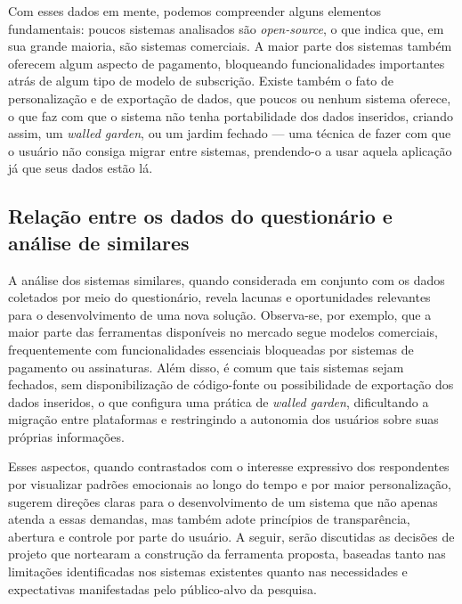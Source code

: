 Com esses dados em mente, podemos compreender alguns elementos fundamentais:
poucos sistemas analisados são \textit{open-source}, o que indica que, em sua
grande maioria, são sistemas comerciais. A maior parte dos sistemas também
oferecem algum aspecto de pagamento, bloqueando funcionalidades importantes
atrás de algum tipo de modelo de subscrição. Existe também o fato de
personalização e de exportação de dados, que poucos ou nenhum sistema oferece,
o que faz com que o sistema não tenha portabilidade dos dados inseridos,
criando assim, um \textit{walled garden}, ou um jardim fechado --- uma técnica de
fazer com que o usuário não consiga migrar entre sistemas, prendendo-o a usar
aquela aplicação já que seus dados estão lá.

\subsection{Relação entre os dados do questionário e análise de similares}

A análise dos sistemas similares, quando considerada em conjunto com os dados
coletados por meio do questionário, revela lacunas e oportunidades relevantes
para o desenvolvimento de uma nova solução. Observa-se, por exemplo, que a
maior parte das ferramentas disponíveis no mercado segue modelos comerciais,
frequentemente com funcionalidades essenciais bloqueadas por sistemas de
pagamento ou assinaturas. Além disso, é comum que tais sistemas sejam fechados,
sem disponibilização de código-fonte ou possibilidade de exportação dos dados
inseridos, o que configura uma prática de \textit{walled garden}, dificultando
a migração entre plataformas e restringindo a autonomia dos usuários sobre suas
próprias informações.

Esses aspectos, quando contrastados com o interesse expressivo dos respondentes
por visualizar padrões emocionais ao longo do tempo e por maior personalização,
sugerem direções claras para o desenvolvimento de um sistema que não apenas
atenda a essas demandas, mas também adote princípios de transparência, abertura
e controle por parte do usuário. A seguir, serão discutidas as decisões de
projeto que nortearam a construção da ferramenta proposta, baseadas tanto nas
limitações identificadas nos sistemas existentes quanto nas necessidades e
expectativas manifestadas pelo público-alvo da pesquisa.
